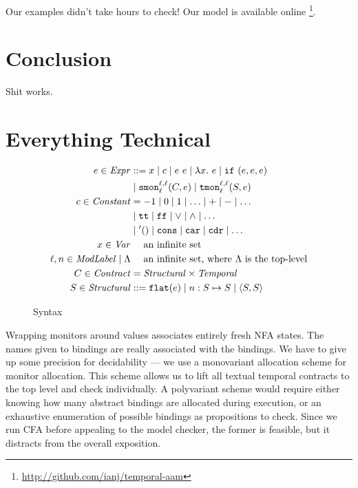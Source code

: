 \documentclass[preprint,onecolumn,9pt]{sigplanconf} %
\begin{document}
Our examples didn't take hours to check!
%
Our model is available online \footnote{\url{http://github.com/ianj/temporal-aam}}.

\section{Conclusion}

Shit works.

\section{Everything Technical}\label{sec:technical}

\begin{figure}
\begin{align*}
e \in \mathit{Expr} &::=
      x
 \mid c
 \mid e\ e
 \mid \lambda x.\ e
 \mid {\tt if}{\ }({e,e,e}) \\
&\mid {\tt smon}{^{\ell,\ell}_{\ell}}({C, e})
 \mid {\tt tmon}{^{\ell,\ell}_{\ell}}({S, e}) \\
c \in \mathit{Constant} &=
 -1 \mid 0 \mid 1 \mid \ldots \mid + \mid - \mid \ldots \\
&\mid {\tt tt} \mid {\tt ff} \mid \vee \mid \wedge \mid \ldots \\
&\mid {\tt '()} \mid \tt cons \mid {\tt car} \mid {\tt cdr} \mid \ldots \\
x \in \mathit{Var} &\quad\text{ an infinite set} \\
\ell,n \in \mathit{ModLabel} \mid \Lambda &\quad\text{ an infinite set, where $\Lambda$ is the top-level} \\
C \in \mathit{Contract} &= \mathit{Structural} \times \mathit{Temporal} \\
S \in \mathit{Structural} &::= {\tt flat}(e) \mid n : S \mapsto S \mid \langle S, S\rangle
\end{align*}
\caption{Syntax}
\label{fig:syntax}
\end{figure}

Wrapping monitors around values associates entirely fresh NFA states.
%
The names given to bindings are really associated with the bindings.
%
We have to give up some precision for decidability --- we use a monovariant allocation scheme for monitor allocation.
%
This scheme allows us to lift all textual temporal contracts to the top level and check individually.
%
A polyvariant scheme would require either knowing how many abstract bindings are allocated during execution, or an exhaustive enumeration of possible bindings as propositions to check.
%
Since we run CFA before appealing to the model checker, the former is feasible, but it distracts from the overall exposition.
\end{document}
